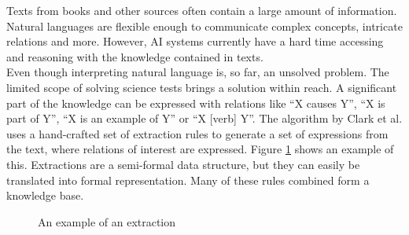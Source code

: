 Texts from books and other sources often contain a large amount of information. Natural languages are flexible enough to communicate complex concepts, intricate relations and more. However, AI systems currently have a hard time accessing and reasoning with the knowledge contained in texts.
\\
Even though interpreting natural language is, so far, an unsolved problem. The limited scope of solving science tests brings a solution within reach. A significant part of the knowledge can be expressed with relations like ``X causes Y'', ``X is part of Y'', ``X is an example of Y'' or ``X [verb] Y''. The algorithm by Clark et al. \cite{construction} uses a hand-crafted set of extraction rules to generate a set of expressions from the text, where relations of interest are expressed. Figure \ref{fig:extraction} shows an example of this. Extractions are a semi-formal data structure, but they can easily be translated into formal representation. Many of these rules combined form a knowledge base.

\begin{figure}
\noindent{}
\caption{An example of an extraction}
\label{fig:extraction}
\end{figure}